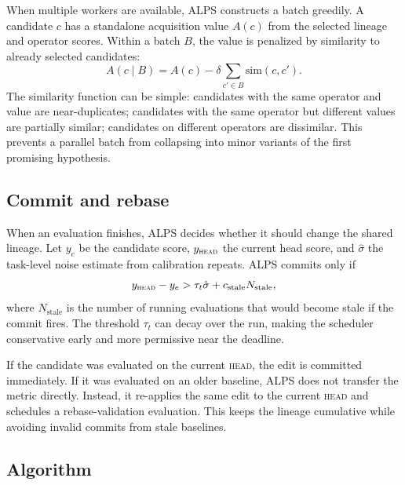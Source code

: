 \documentclass{article}
\newcommand{\alps}{ALPS\xspace}
\newcommand{\HEAD}{\textsc{head}\xspace}
\begin{document}
When multiple workers are available, \alps constructs a batch greedily. A candidate $c$ has a standalone acquisition value $A(c)$ from the selected lineage and operator scores. Within a batch $B$, the value is penalized by similarity to already selected candidates:
\begin{equation}
  A(c \mid B)
  =
  A(c)
  -
  \delta
  \sum_{c' \in B}
  \mathrm{sim}(c,c').
  \label{eq:batch}
\end{equation}
The similarity function can be simple: candidates with the same operator and value are near-duplicates; candidates with the same operator but different values are partially similar; candidates on different operators are dissimilar. This prevents a parallel batch from collapsing into minor variants of the first promising hypothesis.

\subsection{Commit and rebase}

When an evaluation finishes, \alps decides whether it should change the shared lineage. Let $y_e$ be the candidate score, $y_{\HEAD}$ the current head score, and $\hat\sigma$ the task-level noise estimate from calibration repeats. \alps commits only if
\begin{equation}
  y_{\HEAD} - y_e
  >
  \tau_t\hat\sigma
  +
  c_{\mathrm{stale}}N_{\mathrm{stale}},
  \label{eq:gate}
\end{equation}
where $N_{\mathrm{stale}}$ is the number of running evaluations that would become stale if the commit fires. The threshold $\tau_t$ can decay over the run, making the scheduler conservative early and more permissive near the deadline.

If the candidate was evaluated on the current \HEAD, the edit is committed immediately. If it was evaluated on an older baseline, \alps does not transfer the metric directly. Instead, it re-applies the same edit to the current \HEAD and schedules a rebase-validation evaluation. This keeps the lineage cumulative while avoiding invalid commits from stale baselines.

\subsection{Algorithm}
\end{document}
